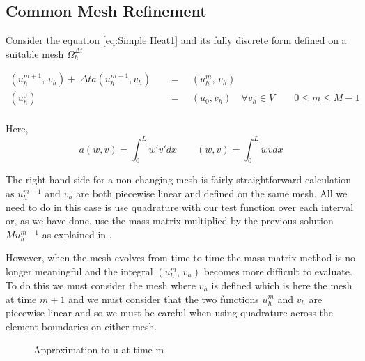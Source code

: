 \documentclass{uonmathreport}
\theoremstyle{definition}
\theoremstyle{problem}
\theoremstyle{theorem}
\begin{document}
\subsection{Common Mesh Refinement} \label{subsec:CMR}

Consider the equation \ref{eq:Simple Heat1} and its fully discrete form defined on a suitable mesh $\Omega^{\Delta t}_h$

\begin{align*}
( u_h^{m+1}, \, v_h)  + \: \Delta t a(u_h^{m+1}, v_h) \quad&=\quad (u_h^{m}, \, v_h )  \\
(u^{0}_h) \quad  &= \quad (u_0, v_h) 
\quad \forall v_h \in V \quad \quad 0 \leq m \leq M-1 \\
\end{align*}

Here,
\begin{equation*}
 a(w, v)  = \int_0^L  w' v'  dx \quad \quad (w, v) = \int_0^L  w v  dx
\end{equation*}
 

The right hand side for a non-changing mesh is fairly straightforward calculation as $u_h^{m-1}$ and $v_h$ are both piecewise linear and defined on the same mesh. All we need to do in this case is use quadrature with our test function over each interval or, as we have done, use the mass matrix multiplied by the previous solution $Mu_h^{m-1}$ as explained in \cite{larson2013finite}. 

However, when the mesh evolves from time to time the mass matrix method is no longer meaningful and the integral $(u_h^{m}, \, v_h )$ becomes more difficult to evaluate. To do this we must consider the mesh where $v_h$ is defined which is here the mesh at time $m+1$ and we must consider that the two functions $u_h^{m}$ and $v_h $ are piecewise linear and so we must be careful when using quadrature across the element boundaries on either mesh.


\begin{figure}[h!]
\caption{Approximation to u at time m}
\begin{center}
\end{center}
\end{figure}
\end{document}
